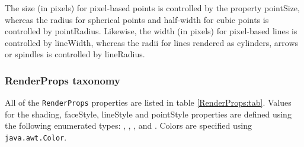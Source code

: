 The size (in pixels) for pixel-based points is controlled by the
property {\sf pointSize}, whereas the radius for spherical points and
half-width for cubic points is controlled by {\sf pointRadius}.
Likewise, the width (in pixels) for pixel-based lines is controlled by
{\sf lineWidth}, whereas the radii for lines rendered as cylinders,
arrows or spindles is controlled by {\sf lineRadius}.

\subsubsection{RenderProps taxonomy}

All of the {\tt RenderProps} properties are listed in table 
\ref{RenderProps:tab}.
Values for the {\sf shading}, {\sf
faceStyle}, {\sf lineStyle} and {\sf pointStyle} properties are
defined using the following enumerated types:
, 
, 
, 
and 
.
Colors are specified using {\tt java.awt.Color}.

